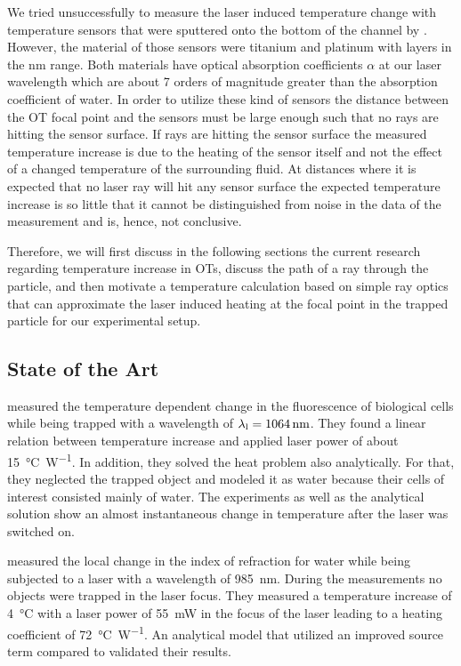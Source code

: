 We tried unsuccessfully to measure the laser induced temperature change with 
temperature sensors that were sputtered onto the bottom of the channel by 
. However, the material of those sensors were titanium and 
platinum with layers in the \si{\nm} range. Both materials have optical 
absorption coefficients $\alpha$ at our laser wavelength which are about 7 
orders of magnitude greater than the absorption coefficient of water. In order 
to utilize these kind of sensors the distance between the OT focal point and 
the sensors must be large enough such that no rays are hitting the sensor 
surface. If rays are hitting the sensor surface the measured temperature 
increase is due to the heating of the sensor itself and not the effect of a 
changed temperature of the surrounding fluid. At distances where it is expected 
that no laser ray will hit any sensor surface the expected temperature increase 
is so little that it cannot be distinguished from noise in the data of the 
measurement and is, hence, not conclusive.

Therefore, we will first discuss in the following sections the current research 
regarding temperature increase in OTs, discuss the path of a ray through the 
particle, and then motivate a temperature calculation based on simple ray 
optics that can approximate the laser induced heating at the focal point in the 
trapped particle for our experimental setup.

\subsection{State of the Art}\label{sec:TO-state}

 measured the temperature dependent change in the fluorescence 
of biological cells while being trapped with a wavelength of 
$\lal=\SI{1064}{\nm}$. They found a linear relation between temperature 
increase and applied laser power of about \SI{15}{\degreeCelsius\per\watt}. In 
addition, they solved the heat problem also analytically. For that, they 
neglected the trapped object and modeled it as water because their cells of 
interest consisted mainly of water. The experiments as well as the analytical 
solution show an almost instantaneous change in temperature after the laser was 
switched on.

 measured the local change in the index of refraction for 
water while being subjected to a laser with a wavelength of \SI{985}{\nm}. 
During the measurements no objects were trapped in the laser focus. They 
measured a temperature increase of \SI{4}{\degreeCelsius} with a laser power of 
\SI{55}{\milli\watt} in the focus of the laser leading to a heating coefficient 
of \SI{72}{\degreeCelsius\per\watt}. An analytical model that utilized an 
improved source term compared to \cite{Liu1995} validated their results.

